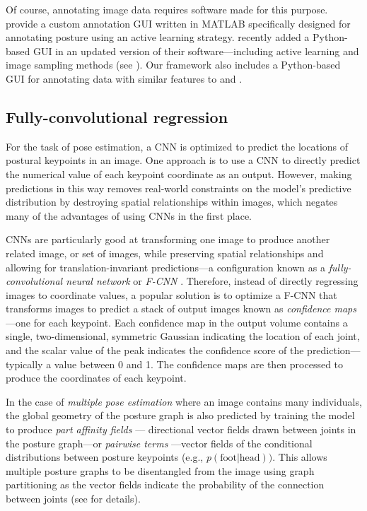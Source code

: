 \documentclass[11pt,a4paper,oneside]{article}
\begin{document}
\begin{appendices}
Of course, annotating image data requires software made for this purpose. \cite{pereira2019fast} provide a custom annotation GUI written in MATLAB specifically designed for annotating posture using an active learning strategy. \cite{mathis2018deeplabcut} recently added a Python-based GUI in an updated version of their software—including active learning and image sampling methods (see \citealt{nath2018}). Our framework also includes a Python-based GUI for annotating data with similar features to \cite{mathis2018deeplabcut} and \cite{pereira2019fast}. 



\subsection{Fully-convolutional regression}
\label{app:fcnn}

For the task of pose estimation, a CNN is optimized to predict the locations of postural keypoints in an image. One approach is to use a CNN to directly predict the numerical value of each keypoint coordinate as an output. However, making predictions in this way removes real-world constraints on the model's predictive distribution by destroying spatial relationships within images, which negates many of the advantages of using CNNs in the first place.

CNNs are particularly good at transforming one image to produce another related image, or set of images, while preserving spatial relationships and allowing for translation-invariant predictions—a configuration known as a \textit{fully-convolutional neural network} or \textit{F-CNN} \citep{long2015fully}. Therefore, instead of directly regressing images to coordinate values, a popular solution \citep{newell2016, insafutdinov2016deepercut,mathis2018deeplabcut,pereira2019fast} is to optimize a F-CNN that transforms images to predict a stack of output images known as \textit{confidence maps}—one for each keypoint. Each confidence map in the output volume contains a single, two-dimensional, symmetric Gaussian indicating the location of each joint, and the scalar value of the peak indicates the confidence score of the prediction—typically a value between 0 and 1. The confidence maps are then processed to produce the coordinates of each keypoint.

In the case of \textit{multiple pose estimation} where an image contains many individuals, the global geometry of the posture graph is also predicted by training the model to produce \textit{part affinity fields} \citep{cao2017realtime}— directional vector fields drawn between joints in the posture graph—or \textit{pairwise terms} \citep{insafutdinov2016deepercut}—vector fields of the conditional distributions between posture keypoints (e.g., $p(\textrm{foot}|\textrm{head}))$. This allows multiple posture graphs to be disentangled from the image using graph partitioning as the vector fields indicate the probability of the connection between joints (see \citealt{cao2017realtime} for details).



\end{appendices}
\end{document}
